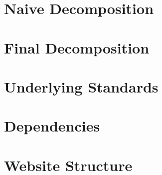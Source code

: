 \section{Naive Decomposition}

\section{Final Decomposition}

\section{Underlying Standards}

\section{Dependencies}

\section{Website Structure}

